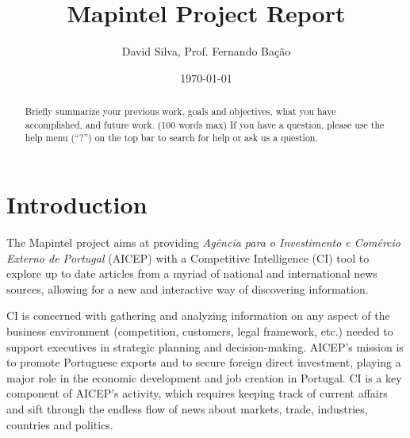 \documentclass[a4paper]{article}
\title{Mapintel Project Report}
\author{David Silva, Prof. Fernando Bação}
\date{\today}
\begin{document}
\maketitle

\begin{abstract}
	Briefly summarize your previous work, goals and objectives, what you have accomplished, and future work. (100 words max) If you have a question, please use the help menu (``?'') on the top bar to search for help or ask us a question.
\end{abstract}
\section*{Introduction}
The Mapintel project aims at providing \textit{Agência para o Investimento e Comércio Externo de Portugal} (AICEP) with a Competitive Intelligence (CI) tool to explore up to date articles from a myriad of national and international news sources, allowing for a new and interactive way of discovering information. 

CI is concerned with gathering and analyzing information on any aspect of the business environment (competition, customers, legal framework, etc.) needed to support executives in strategic planning and decision-making. AICEP’s mission is to promote Portuguese exports and to secure foreign direct investment, playing a major role in the economic development and job creation in Portugal. CI is a key component of AICEP’s activity, which requires keeping track of current affairs and sift through the endless flow of news about markets, trade, industries, countries and politics.

\end{document}
